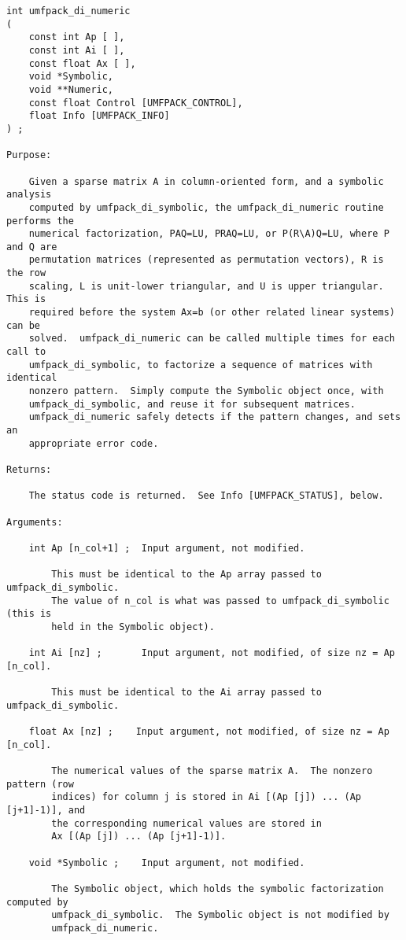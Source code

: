 \documentclass[11pt]{article}
\begin{document}
{\footnotesize
\begin{verbatim}
int umfpack_di_numeric
(
    const int Ap [ ],
    const int Ai [ ],
    const float Ax [ ],
    void *Symbolic,
    void **Numeric,
    const float Control [UMFPACK_CONTROL],
    float Info [UMFPACK_INFO]
) ;

Purpose:

    Given a sparse matrix A in column-oriented form, and a symbolic analysis
    computed by umfpack_di_symbolic, the umfpack_di_numeric routine performs the
    numerical factorization, PAQ=LU, PRAQ=LU, or P(R\A)Q=LU, where P and Q are
    permutation matrices (represented as permutation vectors), R is the row
    scaling, L is unit-lower triangular, and U is upper triangular.  This is
    required before the system Ax=b (or other related linear systems) can be
    solved.  umfpack_di_numeric can be called multiple times for each call to
    umfpack_di_symbolic, to factorize a sequence of matrices with identical
    nonzero pattern.  Simply compute the Symbolic object once, with
    umfpack_di_symbolic, and reuse it for subsequent matrices.
    umfpack_di_numeric safely detects if the pattern changes, and sets an
    appropriate error code.

Returns:

    The status code is returned.  See Info [UMFPACK_STATUS], below.

Arguments:

    int Ap [n_col+1] ;  Input argument, not modified.

        This must be identical to the Ap array passed to umfpack_di_symbolic.
        The value of n_col is what was passed to umfpack_di_symbolic (this is
        held in the Symbolic object).

    int Ai [nz] ;       Input argument, not modified, of size nz = Ap [n_col].

        This must be identical to the Ai array passed to umfpack_di_symbolic.

    float Ax [nz] ;    Input argument, not modified, of size nz = Ap [n_col].

        The numerical values of the sparse matrix A.  The nonzero pattern (row
        indices) for column j is stored in Ai [(Ap [j]) ... (Ap [j+1]-1)], and
        the corresponding numerical values are stored in
        Ax [(Ap [j]) ... (Ap [j+1]-1)].

    void *Symbolic ;    Input argument, not modified.

        The Symbolic object, which holds the symbolic factorization computed by
        umfpack_di_symbolic.  The Symbolic object is not modified by
        umfpack_di_numeric.


\end{verbatim}}
\end{document}
